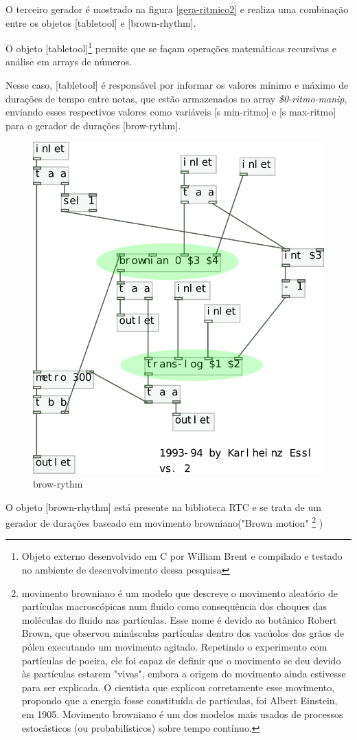 \documentclass{ppgmus}
\begin{document}
O terceiro gerador é mostrado na figura \ref{gera-ritmico2} e
realiza uma combinação entre os objetos [tabletool] e [brown-rhythm].

O objeto [tabletool]\footnote{Objeto externo desenvolvido em C
por William Brent e compilado e testado no ambiente de desenvolvimento
dessa pesquisa} permite que se façam operações matemáticas
recursivas e análise em arrays de números. 

Nesse caso, [tabletool] é responsável por informar os valores
mínimo e máximo de durações de tempo entre notas, que estão
armazenados no array \textit{\$0-ritmo-manip}, enviando
esses respectivos valores como variáveis [s min-ritmo] e 
[s max-ritmo] para o gerador de durações [brow-rythm].


 \begin{figure}[!ht]
\includegraphics[scale=.6]{brown-rythm}
\caption{brow-rythm}
\label{brown-rythm}
\end{figure}  

O objeto [brown-rhythm] está presente na biblioteca RTC e se trata de
um gerador de durações baseado em movimento browniano("Brown motion"
\footnote{movimento browniano é um modelo que descreve o movimento aleatório 
de partículas macroscópicas num fluido como consequência dos choques das 
moléculas do fluido nas partículas. Esse nome é devido ao botânico Robert
Brown, que observou minúsculas partículas dentro dos vacúolos dos grãos de 
pólen executando um movimento agitado. Repetindo o experimento com partículas de poeira, 
ele foi capaz de definir que o movimento se deu devido às partículas estarem "vivas", 
embora a origem do movimento ainda estivesse para ser explicada.
O cientista que explicou corretamente esse movimento, propondo que a energia fosse 
constituída de partículas, foi Albert Einstein, em 1905.
Movimento browniano é um dos modelos mais usados de processos estocásticos
(ou probabilísticos) sobre tempo contínuo.} )
\end{document}
